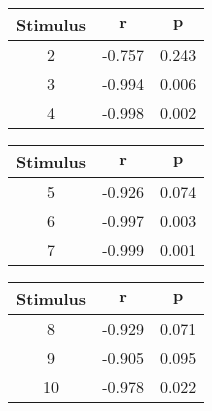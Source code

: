 \begin{tabular}{|c|c|c|}
	\hline
	\bf{Stimulus} & $\boldsymbol{r}$ & $\boldsymbol{p}$ \tabularnewline
	\hline
	\hline
	2 & -0.757 & 0.243 \tabularnewline
	\hline
	3 & -0.994 & 0.006 \tabularnewline
	\hline
	4 & -0.998 & 0.002 \tabularnewline
	\hline
\end{tabular}
\qquad
\begin{tabular}{|c|c|c|}
	\hline
	\bf{Stimulus} & $\boldsymbol{r}$ & $\boldsymbol{p}$ \tabularnewline
	\hline
	\hline
	5 & -0.926 & 0.074 \tabularnewline
	\hline
	6 & -0.997 & 0.003 \tabularnewline
	\hline
	7 & -0.999 & 0.001 \tabularnewline
	\hline
\end{tabular}
\qquad
\begin{tabular}{|c|c|c|}
	\hline
	\bf{Stimulus} & $\boldsymbol{r}$ & $\boldsymbol{p}$ \tabularnewline
	\hline
	\hline
	8 & -0.929 & 0.071 \tabularnewline
	\hline
	9 & -0.905 & 0.095 \tabularnewline
	\hline
	10 & -0.978 & 0.022 \tabularnewline
	\hline
\end{tabular}
